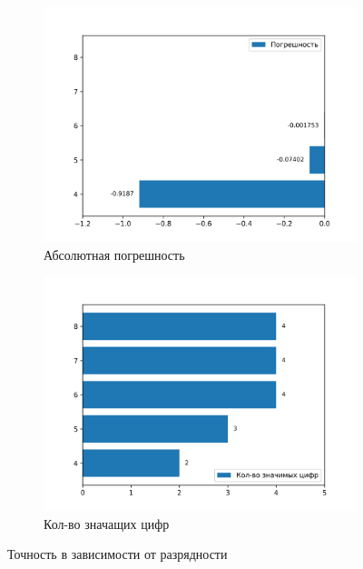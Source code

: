 \documentclass[a4paper,12pt]{article}
\begin{document}
\begin{figure}[H]
\centering
\begin{subfigure}{.5\textwidth}
  \centering
  \includegraphics[width=\linewidth]{plots/series_fixed_error.png}
  \caption{Абсолютная погрешность}
  \label{fig:sub3}
\end{subfigure}%
\begin{subfigure}{.5\textwidth}
  \centering
  \includegraphics[width=\linewidth]{plots/series_fixed_n_digits.png}
  \caption{Кол-во значащих цифр}
  \label{fig:sub4}
\end{subfigure}
\caption{Точность в зависимости от разрядности}
\label{fig:test}
\end{figure}
\end{document}
